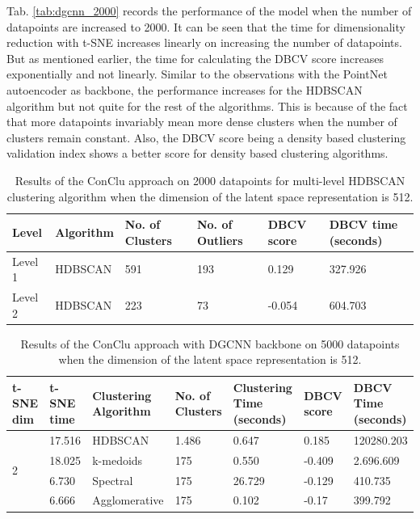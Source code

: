 Tab. \ref{tab:dgcnn_2000} records the performance of the model when the number of datapoints are increased to 2000. It can be seen that the time for dimensionality reduction with \ac{t-SNE} increases linearly on increasing the number of datapoints. But as mentioned earlier, the time for calculating the \ac{DBCV} score increases exponentially and not linearly. Similar to the observations with the PointNet autoencoder as backbone, the performance increases for the \ac{HDBSCAN} algorithm but not quite for the rest of the algorithms. This is because of the fact that more datapoints invariably mean more dense clusters when the number of clusters remain constant. Also, the \ac{DBCV} score  being a density based clustering validation index shows a better score for density based clustering algorithms. 

\begin{table}[H]
  \setlength\extrarowheight{10pt}
  \caption{Results of the ConClu approach on 2000 datapoints for multi-level \ac{HDBSCAN} clustering algorithm when the dimension of the latent space representation is 512. }
  \centering
  \begin{tabular}{|l|l|l|l|l|l|}
    \toprule
    Level & Algorithm	& No. of Clusters	& No. of Outliers	& DBCV score	& \ac{DBCV} time (seconds)	\\  
    \midrule
    Level 1 & \ac{HDBSCAN} & 591	& 193	& 0.129	& 327.926 \\ \cline{1-6}
    Level 2 & \ac{HDBSCAN} & 223	& 73	& -0.054	& 604.703
    \\ 
    \bottomrule
  \end{tabular}
  \label{tab:dgcnn_2000_levels}
\end{table} 

\begin{table}[H]
  \setlength\extrarowheight{10pt}
  \caption{Results of the ConClu approach with \ac{DGCNN} backbone on 5000 datapoints when the dimension of the latent space representation is 512. }
  \centering
  \begin{tabular}{|p{30pt}|p{50pt}|p{60pt}|p{50pt}|p{50pt}|p{40pt}|p{50pt}|}
    \toprule
    \ac{t-SNE} dim	& \ac{t-SNE} time & Clustering Algorithm & No. of Clusters & Clustering Time (seconds) & \ac{DBCV} score & \ac{DBCV} Time (seconds)\\
    \midrule
    \multirow{4}{30pt}{2}	& 17.516	& \ac{HDBSCAN}	& 1.486	& 0.647	& 0.185	& 120280.203 \\ \cline{2-7} 
    & 18.025	& k-medoids	& 175	& 0.550	& -0.409	& 2.696.609 \\ \cline{2-7} 
    & 6.730	& Spectral	& 175	& 26.729	& -0.129	& 410.735 \\ \cline{2-7}
    & 6.666	& Agglomerative	& 175	& 0.102	& -0.17	& 399.792 \\ 
    \bottomrule
  \end{tabular}
  \label{tab:dgcnn_5000}
\end{table}

